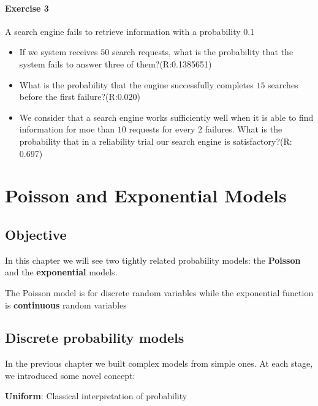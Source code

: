 \documentclass[
]{book}
\begin{document}
\hypertarget{exercise-3-4}{%
\subsubsection{Exercise 3}\label{exercise-3-4}}

A search engine fails to retrieve information with a probability \(0.1\)

\begin{itemize}
\item
  If we system receives \(50\) search requests, what is the probability that the system fails to answer three of them?(R:0.1385651)
\item
  What is the probability that the engine successfully completes \(15\) searches before the first failure?(R:0.020)
\item
  We consider that a search engine works sufficiently well when it is able to find information for moe than \(10\) requests for every \(2\) failures. What is the probability that in a reliability trial our search engine is satisfactory?(R: 0.697)
\end{itemize}

\hypertarget{poisson-and-exponential-models}{%
\chapter{Poisson and Exponential Models}\label{poisson-and-exponential-models}}

\hypertarget{objective-3}{%
\section{Objective}\label{objective-3}}

In this chapter we will see two tightly related probability models: the \textbf{Poisson} and the \textbf{exponential} models.

The Poisson model is for discrete random variables while the exponential function is \textbf{continuous} random variables

\hypertarget{discrete-probability-models-1}{%
\section{Discrete probability models}\label{discrete-probability-models-1}}

In the previous chapter we built complex models from simple ones. At each stage, we introduced some novel concept:

\textbf{Uniform}: Classical interpretation of probability
\end{document}

